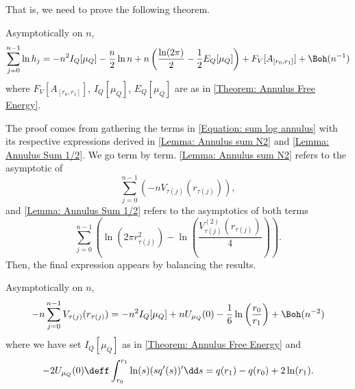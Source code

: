 That is, we need to prove the following theorem.

\begin{teorema}			\label{Theorem: Annulus sum}
	Asymptotically on $n$,
	\begin{equation}
		\sum_{j=0}^{n-1} \ln{h_j} = - n^2 I_Q[\mu_Q] - \frac{n}{2} \ln n + n \left(\frac{\ln(2\pi)}{2} - \frac{1}{2} E_Q[\mu_Q]\right) + F_V[A_{[r_0, r_1]}] + \Boh(n^{-1}) 
	\end{equation}
	where $F_V[A_{[r_0, r_1]}]$, $I_Q[\mu_Q]$, $	E_Q[\mu_Q]$ are as in \autoref{Theorem: Annulus Free Energy}.
\end{teorema}

The proof comes from gathering the terms in \eqref{Equation: sum log annulus} with its respective expressions derived in \autoref{Lemma: Annulus sum N2} and \autoref{Lemma: Annulus Sum 1/2}. We go term by term. \autoref{Lemma: Annulus sum N2} refers to the asymptotic of 
\begin{equation}
	\sum_{j=0}^{n-1} \left(-n V_{\tau(j)}(r_{\tau(j)})\right),
\end{equation}
and \autoref{Lemma: Annulus Sum 1/2} refers to the asymptotics of both terms 
\begin{equation}
	\sum_{j=0}^{n-1}\left(\ln(2\pi r^2_{\tau(j)}) - \ln\left(\frac{V^{(2)}_{\tau(j)}(r_{\tau(j)})}{4}\right)\right).
\end{equation}
Then, the final expression appears by balancing the results.

\begin{lema} 	\label{Lemma: Annulus sum N2}
	Asymptotically on $n$,
	\begin{equation}
		- n \sum_{j=0}^{n-1} V_{\tau(j)}(r_{\tau(j)}) = - n^2 I_Q[\mu_Q] + n U_{\mu_Q}(0) - \frac{1}{6} \ln{\left( \frac{r_0}{r_1}\right)} + \Boh(n^{-2})
		\label{Equation: sum V annulus}
	\end{equation}
	where we have set $I_Q[\mu_Q]$ as in \autoref{Theorem: Annulus Free Energy} and
	\begin{equation}
		- 2 U_{\mu_Q}(0) \deff \int_{r_0}^{r_1} \ln(s) (s q'(s))' \dd s  = q(r_1) - q(r_0) + 2 \ln(r_1).
	\end{equation}
\end{lema}
	

